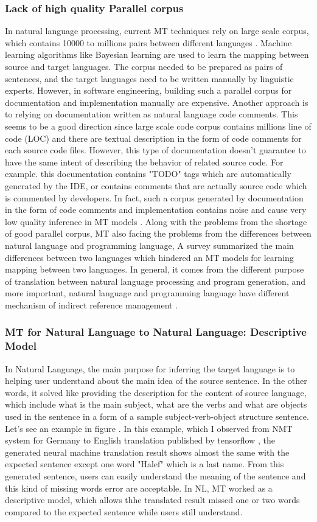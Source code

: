 \subsubsection{Lack of high quality Parallel corpus}
In natural language processing, current MT techniques rely on large scale corpus, which contains 10000 to millions pairs between different languages \cite{}. Machine learning algorithms like Bayesian learning are used to learn the mapping between source and target  languages. The corpus needed to be prepared as pairs of sentences, and the target languages need to be written manually by linguistic experts. However, in software engineering, building such a parallel corpus for documentation and implementation manually are expensive. 
Another approach is to relying on documentation written as natural language code comments. This seems to be a good direction since large scale code corpus contains millions line of code (LOC) and there are textual description in the form of code comments for each source code files. However, this type of documentation doesn't guarantee to have the same intent of describing the behavior of related source code. For example. this documentation contains "TODO" tags which are automatically generated by the IDE, or  contains comments that are actually source code which is commented by developers. In fact, such a corpus generated by documentation in the form of code comments and implementation contains noise and cause very low quality inference in MT models \cite{} .
Along with the problems from the shortage of good parallel corpus, MT also facing the problems from the differences between natural language and programming language, A survey \cite{} summarized the main differences between two languages which hindered an MT models for learning mapping between two languages. In general, it comes from the different purpose of translation between natural language processing and program generation, and more important, natural language and programming language have different mechanism of indirect reference management \cite{}.
\subsubsection{MT for Natural Language to Natural Language: Descriptive Model}
In Natural Language, the main purpose for inferring the target language is to helping user understand about the main idea of the source sentence. In the other words, it solved like providing the description for the content of source language, which include what is the main subject, what are the verbs and what are objects used in the sentence in a form of a sample subject-verb-object structure sentence. Let's see an example in figure \cite{}. In this example, which I observed from NMT system for Germany to English translation published by tensorflow \cite{}, the generated neural machine translation result shows almost the same with the expected sentence except one word "Halef" which is a last name. From this generated sentence, users can easily understand the meaning of the sentence and this kind of missing words error are acceptable. In NL, MT worked as a descriptive model, which allows thhe translated result missed one or two words compared to the expected sentence while users still understand.
